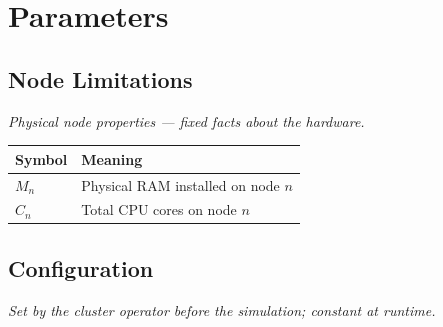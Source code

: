 \documentclass[11pt]{article}
\begin{document}
\section{Parameters}

\subsection*{Node Limitations}
\textit{Physical node properties --- fixed facts about the hardware.}

\medskip
\begin{center}
\begin{tabular}{@{}l p{10.5cm}@{}}
\toprule
Symbol & Meaning \\
\midrule
$M_n$ & Physical RAM installed on node $n$ \\[3pt]
$C_n$ & Total CPU cores on node $n$ \\
\bottomrule
\end{tabular}
\end{center}

\subsection*{Configuration}
\textit{Set by the cluster operator before the simulation; constant at runtime.}
\end{document}
